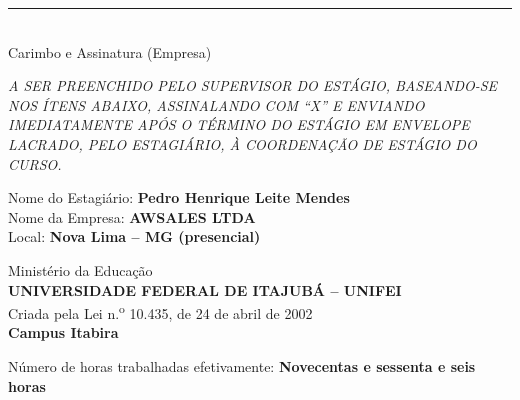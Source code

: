 \documentclass[12pt,a4paper]{article}
\begin{document}
\noindent\rule{8cm}{0.4pt}\\
Carimbo e Assinatura (Empresa)

\vspace{0.8cm}

\noindent\small\textit{A SER PREENCHIDO PELO SUPERVISOR DO ESTÁGIO, BASEANDO-SE NOS ÍTENS ABAIXO, ASSINALANDO COM ``X'' E ENVIANDO IMEDIATAMENTE APÓS O TÉRMINO DO ESTÁGIO EM ENVELOPE LACRADO, PELO ESTAGIÁRIO, À COORDENAÇÃO DE ESTÁGIO DO CURSO.}

\vspace{0.4cm}

\noindent\normalsize Nome do Estagiário: \textbf{Pedro Henrique Leite Mendes}\\
Nome da Empresa: \textbf{AWSALES LTDA}\\
Local: \textbf{Nova Lima -- MG (presencial)}

\clearpage

\begin{center}
{\small
Ministério da Educação\\
\textbf{UNIVERSIDADE FEDERAL DE ITAJUBÁ -- UNIFEI}\\
Criada pela Lei n.\textsuperscript{o} 10.435, de 24 de abril de 2002\\
\textbf{Campus Itabira}
}
\end{center}

\vspace{0.6cm}

\noindent Número de horas trabalhadas efetivamente: \textbf{Novecentas e sessenta e seis horas}

\vspace{0.4cm}
\end{document}
